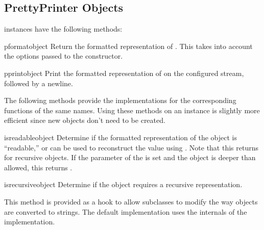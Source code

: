 \subsection{PrettyPrinter Objects}
\label{PrettyPrinter Objects}

 instances have the following methods:


\begin{methoddesc}{pformat}{object}
Return the formatted representation of .  This takes into
account the options passed to the  constructor.
\end{methoddesc}

\begin{methoddesc}{pprint}{object}
Print the formatted representation of  on the configured
stream, followed by a newline.
\end{methoddesc}

The following methods provide the implementations for the
corresponding functions of the same names.  Using these methods on an
instance is slightly more efficient since new 
objects don't need to be created.

\begin{methoddesc}{isreadable}{object}
Determine if the formatted representation of the object is
``readable,'' or can be used to reconstruct the value using
.  Note that this returns  for
recursive objects.  If the  parameter of the
 is set and the object is deeper than allowed,
this returns .
\end{methoddesc}

\begin{methoddesc}{isrecursive}{object}
Determine if the object requires a recursive representation.
\end{methoddesc}

This method is provided as a hook to allow subclasses to modify the
way objects are converted to strings.  The default implementation uses
the internals of the  implementation.

